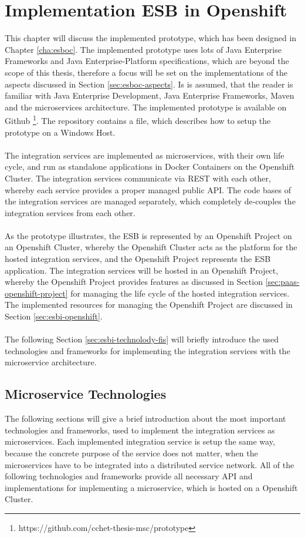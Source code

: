 \chapter{Implementation ESB in Openshift}
\label{cha:esbi}
This chapter will discuss the implemented prototype, which has been designed in Chapter \vref{cha:esboc}. The implemented prototype uses lots of Java Enterprise Frameworks and Java Enterprise-Platform specifications, which are beyond the scope of this thesis, therefore a focus will be set on the implementations of the aspects discussed in Section \vref{sec:esboc-aspects}. Is is assumed, that the reader is familiar with Java Enterprise Development, Java Enterprise Frameworks, Maven and the microservices architecture. The implemented prototype is available on Github \footnote{https://github.com/cchet-thesis-msc/prototype}. The repository contains a  file, which describes how to setup the prototype on a Windows Host. 
\\ \\
The integration services are implemented as microservices, with their own life cycle, and run as standalone applications in Docker Containers on the Openshift Cluster. The integration services communicate via REST with each other, whereby each service provides a proper managed public API. The code bases of the integration services are managed separately, which completely de-couples the integration services from each other.  
\\ \\
As the prototype illustrates, the ESB is represented by an Openshift Project on an Openshift Cluster, whereby the Openshift Cluster acts as the platform for the hosted integration services, and the Openshift Project represents the ESB application. The integration services will be hosted in an Openshift Project, whereby the Openshift Project provides features as discussed in Section \vref{sec:paas-openshift-project} for managing the life cycle of the hosted integration services. The implemented resources for managing the Openshift Project are discussed in Section \vref{sec:esbi-openshift}.
\\ \\
The following Section \vref{sec:esbi-technolody-fis} will briefly introduce the used technologies and frameworks for implementing the integration services with the microservice architecture.

\section{Microservice Technologies}
\label{sec:esbi-technolody-fis}
The following sections will give a brief introduction about the most important technologies and frameworks, used to implement the integration services as microservices. Each implemented integration service is setup the same way, because the concrete purpose of the service does not matter, when the microservices have to be integrated into a distributed service network. All of the following technologies and frameworks provide all necessary API and implementations for implementing a microservice, which is hosted on a Openshift Cluster.

